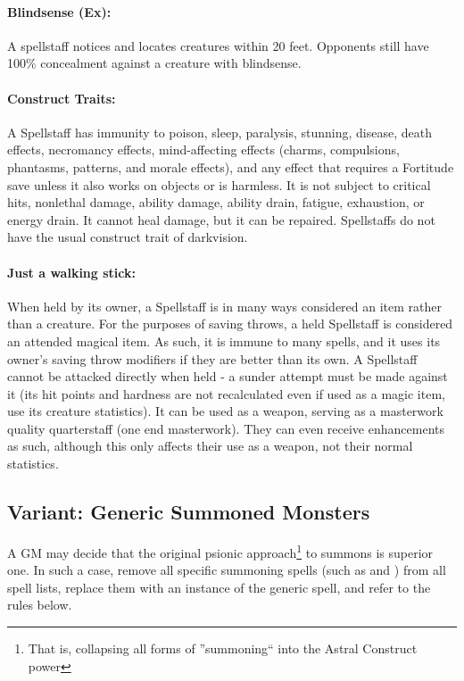 \paragraph{Blindsense (Ex):} A spellstaff notices and locates creatures within 20 feet. Opponents still have 100\% concealment against a creature with blindsense. 
 
\paragraph{Construct Traits:} A Spellstaff has immunity to poison, sleep, paralysis, stunning, disease, death effects, 
necromancy effects, mind-affecting effects (charms, compulsions, phantasms, patterns, and morale effects), 
and any effect that requires a Fortitude save unless it also works on objects or is harmless. 
It is not subject to critical hits, nonlethal damage, ability damage, ability drain, fatigue, exhaustion, or energy drain. 
It cannot heal damage, but it can be repaired. 
Spellstaffs do not have the usual construct trait of darkvision.

\paragraph{Just a walking stick:} When held by its owner, a Spellstaff is in many ways considered an item rather than a creature.
For the purposes of saving throws, a held Spellstaff is considered an attended magical item.
As such, it is immune to many spells, and it uses its owner's saving throw modifiers if they are better than its own.
A Spellstaff cannot be attacked directly when held - a sunder attempt must be made against it
(its hit points and hardness are not recalculated even if used as a magic item, use its creature statistics).
It can be used as a weapon, serving as a masterwork quality quarterstaff (one end masterwork).
They can even receive enhancements as such, although this only affects their use as a weapon, not their normal statistics.

\newpage
\subsection{Variant: Generic Summoned Monsters}
\label{sec:SummonedMonsters}
A GM may decide that the original psionic approach\footnote{That is, collapsing all forms of ''summoning`` into the Astral Construct power} to summons is superior one. In such a case, remove all specific summoning spells (such as  and ) from all spell lists, replace them with an instance of the generic  spell, and refer to the rules below.


